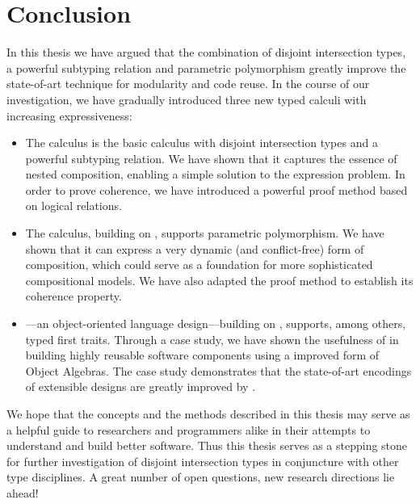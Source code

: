 \chapter{Conclusion}
\label{chap:conclusion}


In this thesis we have argued that the combination of disjoint intersection
types, a powerful subtyping relation and parametric polymorphism greatly improve
the state-of-art technique for modularity and code reuse. In the course of our
investigation, we have gradually introduced three new typed calculi with
increasing expressiveness:
\begin{itemize}
\item The \namee calculus is the basic calculus with disjoint intersection types
  and a powerful subtyping relation. We have shown that it captures the essence
  of nested composition, enabling a simple solution to the expression problem.
  In order to prove coherence, we have introduced a powerful proof method based
  on logical relations.
\item The \fnamee calculus, building on \namee, supports parametric
  polymorphism. We have shown that it can express a very dynamic (and
  conflict-free) form of composition, which could serve as a foundation for more
  sophisticated compositional models. We have also adapted the proof method to
  establish its coherence property.
\item \sedel---an object-oriented language design---building on \fnamee,
  supports, among others, typed first traits. Through a case study, we have
  shown the usefulness of \fnamee in building highly reusable software
  components using a improved form of Object Algebras. The case study
  demonstrates that the state-of-art encodings of extensible designs are greatly
  improved by \fnamee.
\end{itemize}

We hope that the concepts and the methods described in this thesis may serve as
a helpful guide to researchers and programmers alike in their attempts to
understand and build better software. Thus this thesis serves as a stepping
stone for further investigation of disjoint intersection types in conjuncture
with other type disciplines. A great number of open questions, new research
directions lie ahead!




